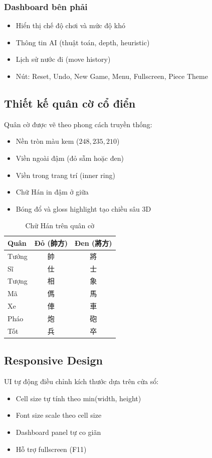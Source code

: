 \subsubsection{Dashboard bên phải}
\begin{itemize}
    \item Hiển thị chế độ chơi và mức độ khó
    \item Thông tin AI (thuật toán, depth, heuristic)
    \item Lịch sử nước đi (move history)
    \item Nút: Reset, Undo, New Game, Menu, Fullscreen, Piece Theme
\end{itemize}

\subsection{Thiết kế quân cờ cổ điển}
Quân cờ được vẽ theo phong cách truyền thống:
\begin{itemize}
    \item Nền tròn màu kem ($248, 235, 210$)
    \item Viền ngoài đậm (đỏ sẫm hoặc đen)
    \item Viền trong trang trí (inner ring)
    \item Chữ Hán in đậm ở giữa
    \item Bóng đổ và gloss highlight tạo chiều sâu 3D
\end{itemize}

\begin{table}[H]
\centering
\caption{Chữ Hán trên quân cờ}
\begin{tabular}{lcc}
\toprule
\textbf{Quân} & \textbf{Đỏ (帥方)} & \textbf{Đen (將方)} \\
\midrule
Tướng & 帥 & 將 \\
Sĩ & 仕 & 士 \\
Tượng & 相 & 象 \\
Mã & 傌 & 馬 \\
Xe & 俥 & 車 \\
Pháo & 炮 & 砲 \\
Tốt & 兵 & 卒 \\
\bottomrule
\end{tabular}
\end{table}

\subsection{Responsive Design}
UI tự động điều chỉnh kích thước dựa trên cửa sổ:
\begin{itemize}
    \item Cell size tự tính theo min(width, height)
    \item Font size scale theo cell size
    \item Dashboard panel tự co giãn
    \item Hỗ trợ fullscreen (F11)
\end{itemize}
